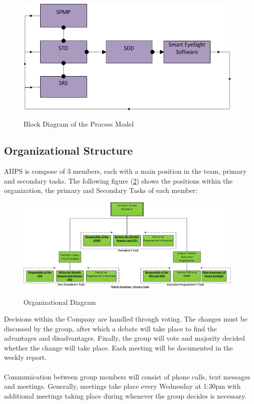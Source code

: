 \documentclass[12pt]{article}
\begin{document}
\begin{figure}[H]\centering
  \includegraphics[width=6.0in]{block_diagram_Org_Struct}\\
  \caption{Block Diagram of the Process Model}\label{org_struct}
  \end{figure}

\subsection{Organizational Structure}
AIIPS is compose of 3 members, each with a main position in the team, primary and secondary tasks. The following figure (\ref{org_diagram}) shows the positions within the organization, the primary and Secondary Tasks of each member:

\begin{figure}[H]\centering
  \includegraphics[width=6.0in]{org_diagram}\\
  \caption{Organizational Diagram}\label{org_diagram}
  \end{figure}

Decisions within the Company are handled through voting. The changes must be discussed by the group, after which a debate will take place to find the advantages and disadvantages. Finally, the group will vote and majority decided whether the change will take place. Each meeting will be documented in the weekly report.\\\\
Communication between group members will consist of phone calls, text messages and meetings. Generally, meetings take place every Wednesday at 1:30pm with additional meetings taking place during whenever the group decides is necessary.
\end{document}
